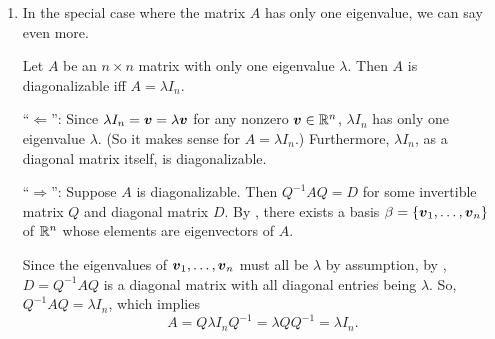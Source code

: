\begin{enumerate}
\item \label{it:one-eigenval-identity} In the special case where the matrix
\(A\) has only one eigenvalue, we can say even more.

Let \(A\) be an \(n\times n\) matrix with only one eigenvalue \(\lambda\). Then
\(A\) is diagonalizable iff \(A=\lambda I_n\).

\begin{pf}
``\(\Leftarrow\)'': Since \(\lambda I_n=\vb*{v}=\lambda\vb*{v}\) for any
nonzero \(\vb*{v}\in\mathbb{R}^n\), \(\lambda I_n\) has only one eigenvalue
\(\lambda\). (So it makes sense for \(A=\lambda I_n\).) Furthermore, \(\lambda
I_n\), as a diagonal matrix itself, is diagonalizable.

``\(\Rightarrow\)'': Suppose \(A\) is diagonalizable. Then \(Q^{-1}AQ=D\) for
some invertible matrix \(Q\) and diagonal matrix \(D\). By
, there exists a basis
\(\beta=\{\vb*{v}_1,\dotsc,\vb*{v}_n\}\) of \(\mathbb{R}^n\) whose elements are
eigenvectors of \(A\).

Since the eigenvalues of \(\vb*{v}_1,\dotsc,\vb*{v}_n\) must all be
\(\lambda\) by assumption, by , \(D=Q^{-1}AQ\) is a
diagonal matrix with all diagonal entries being \(\lambda\). So,
\(Q^{-1}AQ=\lambda I_n\), which implies
\[
A=Q\lambda I_nQ^{-1}
=\lambda QQ^{-1}
=\lambda I_n.
\]
\end{pf}
\end{enumerate}

